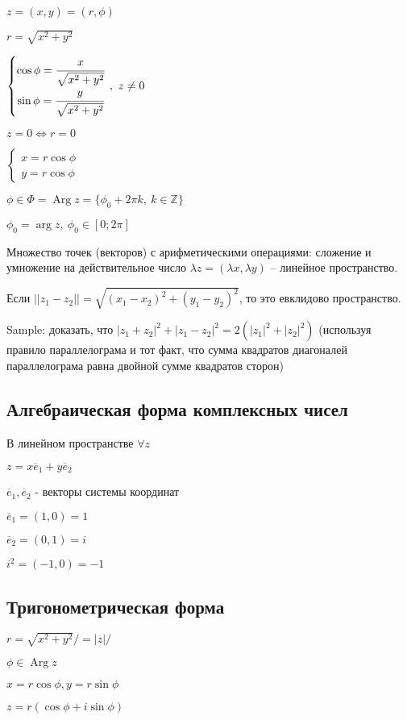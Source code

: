 \documentclass[draft]{report}
\newcommand{\Z}{\mathbb{Z}}
\newcommand{\LRA}{\Leftrightarrow}
\renewcommand{\bar}{\overline}
\newcommand{\Arg}{\mathop{\mathrm{Arg}}\nolimits}
\theoremstyle{remark}
\begin{document}
$z=(x,y)=(r,\phi)$

$r=\sqrt{x^2+y^2}$

$\left\{\begin{matrix}
\cos\phi=\cfrac{x}{\sqrt{x^2+y^2}} \\
\sin\phi=\cfrac{y}{\sqrt{x^2+y^2}}
\end{matrix}\right.\,,\ z\neq0$

$z=0\LRA r=0$

$\left\{\begin{matrix}
x=r\cos\phi\\
y=r\cos\phi
\end{matrix}\right.$

$\phi\in\Phi=\Arg z=\{\phi_0+2\pi k,\ k\in\Z\}$

$\phi_0=\arg z,\ \phi_0\in[0;2\pi]$

Множество точек (векторов) с арифметическими операциями: сложение и умножение на действительное число $\lambda z=(\lambda x, \lambda y)$ -- линейное пространство.

Если $||z_1-z_2||=\sqrt{(x_1-x_2)^2+(y_1-y_2)^2}$, то это евклидово пространство.

Sample: доказать, что $|z_1+z_2|^2+|z_1-z_2|^2=2(|z_1|^2+|z_2|^2)$ (используя правило параллелограма и тот факт, что сумма квадратов диагоналей параллелограма равна двойной сумме квадратов сторон)

\subsection{Алгебраическая форма комплексных чисел}

В линейном пространстве $\forall z$

$z=x\bar{e}_1+y\bar{e}_2$

$\bar{e}_1,\bar{e}_2$ - векторы системы координат

$\bar{e}_1=(1,0)=1$

$\bar{e}_2=(0,1)=i$

$i^2=(-1,0)=-1$

\subsection{Тригонометрическая форма}

$r=\sqrt{x^2+y^2}/=|z|/$

$\phi\in \Arg z$

$x=r\cos\phi, y=r\sin\phi$

$z=r(\cos\phi+i\sin\phi)$
\end{document}
